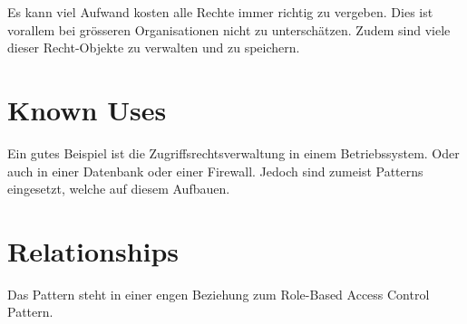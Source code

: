 Es kann viel Aufwand kosten alle Rechte immer richtig zu vergeben. Dies ist vorallem bei grösseren Organisationen nicht zu unterschätzen. Zudem sind viele dieser Recht-Objekte zu verwalten und zu speichern.


\section{Known Uses}
Ein gutes Beispiel ist die Zugriffsrechtsverwaltung in einem Betriebssystem.
Oder auch in einer Datenbank oder einer Firewall. Jedoch sind zumeist Patterns eingesetzt, welche auf diesem Aufbauen.

\section{Relationships}
Das Pattern steht in einer engen Beziehung zum Role-Based Access Control Pattern.
